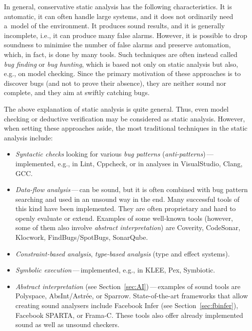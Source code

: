 In general, conservative static analysis has the following characteristics. It is automatic, it can often handle large systems, and it does not ordinarily need a~model of the environment. It produces sound results, and it is generally incomplete, i.e., it can produce many false alarms. However, it is possible to drop soundness to minimise the number of false alarms and preserve automation, which, in fact, is done by many tools. Such techniques are often instead called \emph{bug finding} or \emph{bug hunting}, which is based not only on static analysis but also, e.g., on model checking. Since the primary motivation of these approaches is to discover bugs (and not to prove their absence), they are neither sound nor complete, and they aim at swiftly catching bugs.

The above explanation of static analysis is quite general. Thus, even model checking or deductive verification may be considered as static analysis. However, when setting these approaches aside, the most traditional techniques in the static analysis include:
\begin{itemize}
    \item \emph{Syntactic checks} looking for various \emph{bug patterns} (\emph{anti-patterns})\,---\,implemented, e.g., in Lint, Cppcheck, or in analyses in VisualStudio, Clang, GCC.

    \item \emph{Data-flow analysis}\,---\,can be sound, but it is often combined with bug pattern searching and used in an unsound way in the end. Many successful tools of this kind have been implemented. They are often proprietary and hard to openly evaluate or extend. Examples of some well-known tools (however, some of them also involve \emph{abstract interpretation}) are Coverity, CodeSonar, Klocwork, FindBugs/SpotBugs, SonarQube.

    \item \emph{Constraint-based analysis}, \emph{type-based analysis} (type and effect systems).

    \item \emph{Symbolic execution}\,---\,implemented, e.g., in KLEE, Pex, Symbiotic.

    \item \emph{Abstract interpretation} (see Section~\ref{sec:AI})\,---\,examples of sound tools are Polyspace, AbsInt/Astrée, or Sparrow. State-of-the-art frameworks that allow creating sound analysers include Facebook Infer (see Section~\ref{sec:fbinfer}), Facebook SPARTA, or Frama-C. These tools also offer already implemented sound as well as unsound checkers.
\end{itemize}

